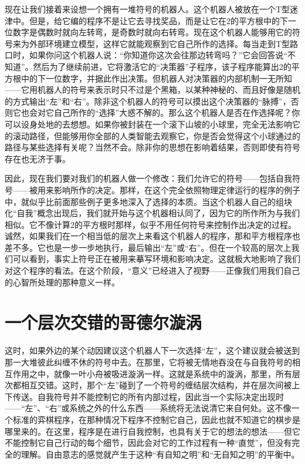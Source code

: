 现在让我们接着来设想一个拥有一堆符号的机器人。这个机器人被放在一个T型迷津中。但是，给它编的程序不是让它去寻找奖品，而是让它在$2$的平方根中的下一位数字是偶数时就向左转弯，是奇数时就向右转弯。现在这个机器人能够用它的符号来为外部环境建立模型，这样它就能观察到它自己所作的选择。每当走到T型路口时，如果你问这个机器人说：“你知道你这次会往那边转弯吗？”它会回答说“不知道”。然后为了继续前进，它将激活它的“决策器”子程序，该子程序能算出$2$的平方根中的下一位数字，并据此作出决策。但机器人对决策器的内部机制一无所知——它用机器人的符号来表示时只不过是个黑箱，以某种神秘的、而且好像是随机的方式输出“左”和“右”。除非这个机器人的符号可以摸出这个决策器的“脉搏”，否则它也会对它自己所作的“选择”大惑不解的。那么这个机器人是否在作选择呢？你可以设身处地的去想想。如果你被封装在一个滚下山坡的小球里，完全无法影响它的滚动路径，但能够用你全部的人类智能去观察它，你是否会觉得这个小球通过的路径与某些选择有关呢？当然不会。除非你的思想在影响着结果，否则即使有符号存在也无济于事。

因此，现在我们要对我们的机器人做一个修改：我们允许它的符号——包括自我符号——被用来影响所作的决定。那样，在这个完全依照物理定律运行的程序的例子中，就似乎比前面那些例子更多地深入了选择的本质。当这个机器人自己的组块化“自我”概念出现后，我们就开始与这个机器相认同了，因为它的所作所为与我们相似。它不像计算$2$的平方根时那样，似乎不用任何符号来控制作出决定的过程。诚然，如果我们在一个相当低的层次上来看这个机器人的程序，那和平方根程序也差不多。它也是一步一步地执行，最后输出“左”或“右”。但在一个较高的层次上我们可以看到，事实上符号正在被用来摹写环境和影响决定。这就极大地影响了我们对这个程序的看法。在这个阶段，“意义”已经进入了视野——正像我们用我们自己的心智所处理的那种意义一样。

\section{一个层次交错的哥德尔漩涡}

这时，如果外边的某个动因建议这个机器人下一次选择“左”，这个建议就会被送到那一大堆彼此纠缠不休的符号中去。在那里，它将被无情地吞没在与自我符号的相互作用之中，就像一叶小舟被吸进漩涡一样。这就是系统中的漩涡，那里，所有层次都相互交错。这时，那个“左”碰到了一个符号的缠结层次结构，并在层次间被上下传送。自我符号并不能控制它的所有内部过程，因此当一个实际决定出现时——“左”、“右”或系统之外的什么东西——系统将无法说清它来自何处。这不像一个标准的弈棋程序，在那种情况下程序不控制它自己，因此也就不知道它的棋步是哪里来的。在这里，程序是在进行自我控制，也具有关于它的想法的想法——但它不能控制它自己行动的每个细节，因此会对它的工作过程有一种“直觉”，但没有完全的理解。自由意志的感觉就产生于这种“有自知之明”和“无自知之明”的平衡中。

